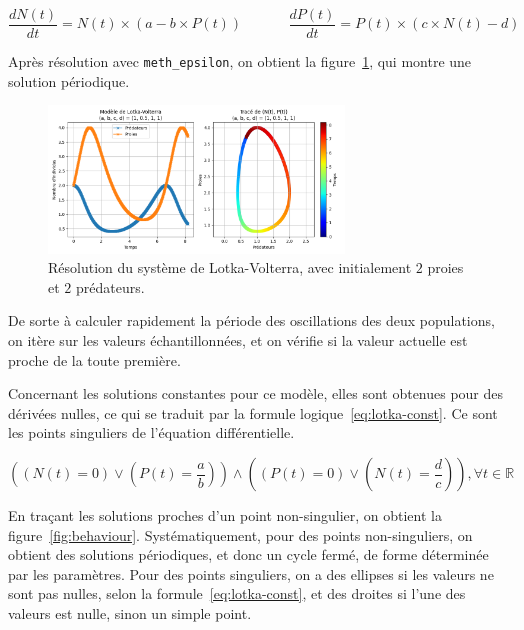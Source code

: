 \begin{equation}
	\label{eq:lotka}
	\frac{dN(t)}{dt} = N(t) \times (a - b \times P(t)) \ \ \ \ \ \ \ \ \ \ \ \ \ \ \
	\frac{dP(t)}{dt} = P(t) \times (c \times N(t) - d)
\end{equation}

Après résolution avec \texttt{meth\_epsilon}, on obtient la figure~\ref{fig:lotka}, qui montre une solution périodique.

\begin{figure}[htbp!]
	\centering
	\includegraphics[width=0.7\textwidth]{res/lotka}
	\caption{Résolution du système de Lotka-Volterra, avec initialement $2$ proies et $2$ prédateurs.}
	\label{fig:lotka}
\end{figure}

De sorte à calculer rapidement la période des oscillations des deux populations, on itère
sur les valeurs échantillonnées, et on vérifie si la valeur actuelle est proche de la toute première.

Concernant les solutions constantes pour ce modèle, elles sont obtenues pour des dérivées nulles,
ce qui se traduit par la formule logique~\ref{eq:lotka-const}. Ce sont les points singuliers
de l'équation différentielle.

\begin{equation}
	\label{eq:lotka-const}
	\left(\left(N(t) = 0\right) \vee \left(P(t) = \frac{a}{b}\right)\right)
	\wedge
	\left(\left(P(t) = 0\right) \vee \left(N(t) = \frac{d}{c}\right)\right), \forall t \in \mathbb{R}
\end{equation}

En traçant les solutions proches d'un point non-singulier, on obtient la figure~\ref{fig:behaviour}. Systématiquement,
pour des points non-singuliers, on obtient des solutions périodiques, et donc un cycle fermé, de forme déterminée par les paramètres.
Pour des points singuliers, on a des ellipses si les valeurs ne sont pas nulles, selon la formule~\ref{eq:lotka-const},
et des droites si l'une des valeurs est nulle, sinon un simple point.

